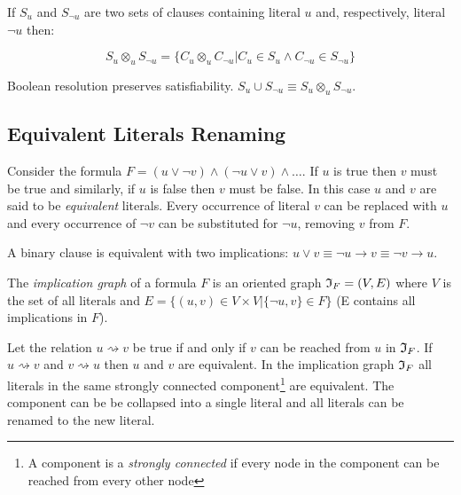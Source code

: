 \begin{mydef}
  If $S_u$ and $S_{\neg u}$ are two sets of clauses containing
  literal $u$ and, respectively, literal $\neg u$ then:

  $$S_u \otimes_{u} S_{\neg u} = \{ C_u \otimes_{u} C_{\neg u} |
  C_u \in S_u \land C_{\neg u} \in S_{\neg u}\}$$
\end{mydef}

\begin{myprop}
  Boolean resolution preserves satisfiability. $S_u \cup S_{\neg u}
  \equiv S_u \otimes_{u} S_{\neg u}$.
\end{myprop}

\subsection{Equivalent Literals Renaming}
\label{ssec:eqlr}

Consider the formula $F = (u \lor \neg v) \land (\neg u \lor v) \land \ldots$.
If $u$ is true then $v$ must be true and similarly, if $u$ is false
then $v$ must be false. In this case $u$ and $v$ are said to be
\emph{equivalent} literals. Every occurrence of literal $v$ can be
replaced with $u$ and every occurrence of $\neg v$ can be
substituted for $\neg u$, removing $v$ from $F$.

\begin{myprop}
  A binary clause is equivalent with two implications:
  $u \lor v \equiv \neg u \rightarrow v \equiv \neg v \rightarrow u$.
\end{myprop}

\begin{mydef}
  The \emph{implication graph} of a formula $F$ is an oriented graph
  $\mathfrak{I}_F = (V, E)$ where $V$ is the set of all literals and $E = \{(u,
  v) \in V \times V | \{\neg u, v\} \in F\}$ (E contains all implications in $F$).
\end{mydef}

Let the relation $u \rightsquigarrow v$ be true if and only if
$v$ can be reached from $u$ in $\mathfrak{I}_F$.  If $u \rightsquigarrow v$
and $v \rightsquigarrow u$ then $u$ and $v$ are equivalent.  In the
implication graph $\mathfrak{I}_F$ all literals in the same strongly connected
component\footnote{A component is a \emph{strongly connected}
if every node in the component can be reached from every other node}
are equivalent. The component can be be collapsed into a single
literal and all literals can be renamed to the new literal.

